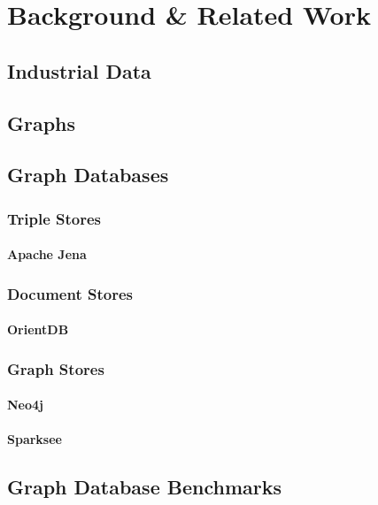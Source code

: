 \chapter{Background \& Related Work}
\label{ch:Background}

\section{Industrial Data}

\section{Graphs}

\section{Graph Databases}

\subsection{Triple Stores}

\subsubsection{Apache Jena}

\subsection{Document Stores}

\subsubsection{OrientDB}

\subsection{Graph Stores}

\subsubsection{Neo4j}

\subsubsection{Sparksee}

\section{Graph Database Benchmarks}

